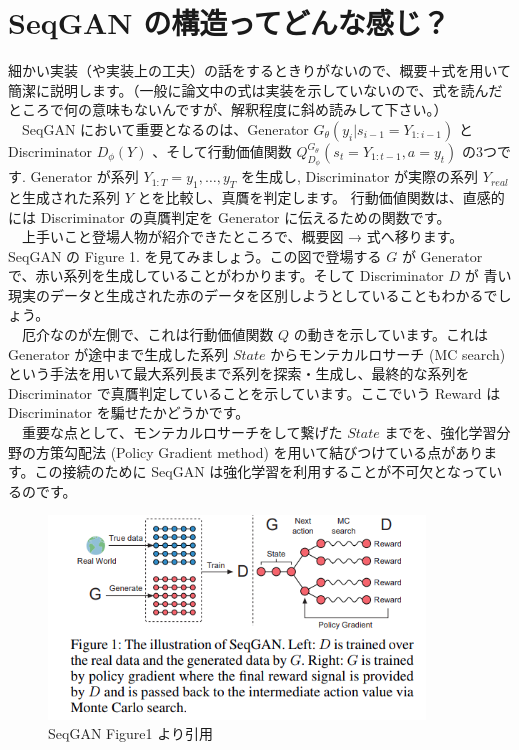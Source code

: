 \documentclass[a4paper, dvipdfmx, 10pt]{article}
\begin{document}
\section{SeqGAN の構造ってどんな感じ？}
\label{sec:org29ea2cd}
細かい実装（や実装上の工夫）の話をするときりがないので、概要＋式を用いて簡潔に説明します。（一般に論文中の式は実装を示していないので、式を読んだところで何の意味もないんですが、解釈程度に斜め読みして下さい。）\\
　SeqGAN において重要となるのは、Generator \(G_\theta(y_i | s_{i-1} = Y_{1:i-1})\) と Discriminator \(D_\phi(Y)\) 、そして行動価値関数 \(Q^{G_\theta}_{D_\phi}(s_t = Y_{1:t-1}, a = y_t)\) の3つです. Generator が系列 \(Y_{1:T} = {y_1, \dots, y_T}\) を生成し, Discriminator が実際の系列 \(Y_{real}\) と生成された系列 \(Y\) とを比較し、真贋を判定します。 行動価値関数は、直感的には Discriminator の真贋判定を Generator に伝えるための関数です。\\
　上手いこと登場人物が紹介できたところで、概要図 → 式へ移ります。SeqGAN の Figure 1. を見てみましょう。この図で登場する \(G\) が Generator で、赤い系列を生成していることがわかります。そして Discriminator \(D\) が 青い現実のデータと生成された赤のデータを区別しようとしていることもわかるでしょう。\\
　厄介なのが左側で、これは行動価値関数 \(Q\) の動きを示しています。これは Generator が途中まで生成した系列 \(State\) からモンテカルロサーチ (MC search) という手法を用いて最大系列長まで系列を探索・生成し、最終的な系列を Discriminator で真贋判定していることを示しています。ここでいう Reward は Discriminator を騙せたかどうかです。\\
　重要な点として、モンテカルロサーチをして繋げた \(State\) までを、強化学習分野の方策勾配法 (Policy Gradient method) を用いて結びつけている点があります。この接続のために SeqGAN は強化学習を利用することが不可欠となっているのです。
\begin{figure}[htbp]
\centering
\includegraphics[width=10cm]{./img/seqgan.png}
\caption{SeqGAN Figure1 より引用}
\end{figure}
\end{document}
